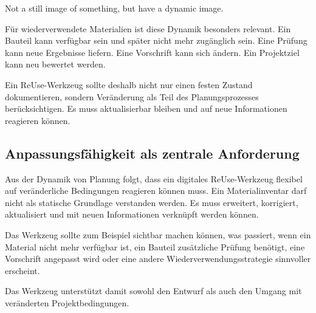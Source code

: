 \begin{Blockquote}
Not a still image of something, but have a dynamic image.
\end{Blockquote}

Für wiederverwendete Materialien ist diese Dynamik besonders relevant. Ein Bauteil kann verfügbar sein und später nicht mehr zugänglich sein. Eine Prüfung kann neue Ergebnisse liefern. Eine Vorschrift kann sich ändern. Ein Projektziel kann neu bewertet werden.

Ein ReUse-Werkzeug sollte deshalb nicht nur einen festen Zustand dokumentieren, sondern Veränderung als Teil des Planungsprozesses berücksichtigen. Es muss aktualisierbar bleiben und auf neue Informationen reagieren können.

\subsection{Anpassungsfähigkeit als zentrale Anforderung}

Aus der Dynamik von Planung folgt, dass ein digitales ReUse-Werkzeug flexibel auf veränderliche Bedingungen reagieren können muss. Ein Materialinventar darf nicht als statische Grundlage verstanden werden. Es muss erweitert, korrigiert, aktualisiert und mit neuen Informationen verknüpft werden können.

Das Werkzeug sollte zum Beispiel sichtbar machen können, was passiert, wenn ein Material nicht mehr verfügbar ist, ein Bauteil zusätzliche Prüfung benötigt, eine Vorschrift angepasst wird oder eine andere Wiederverwendungsstrategie sinnvoller erscheint.

Das Werkzeug unterstützt damit sowohl den Entwurf als auch den Umgang mit veränderten Projektbedingungen.
